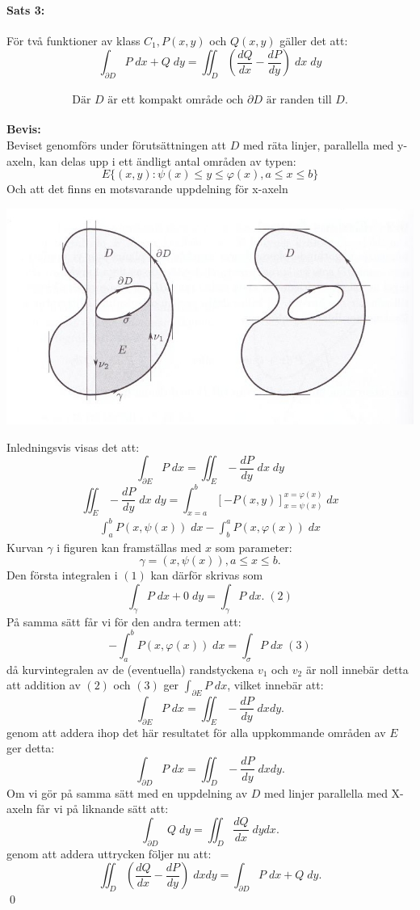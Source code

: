 \paragraph{Sats 3:} För två funktioner av klass $C_1, P(x, y)$ och $Q(x, y)$ gäller det att:
$$\int_{\partial D} P\; dx + Q \; dy = \iint_D \left ( \frac {d Q} {d x} - \frac {d P} {d y}
	\right ) \; dx \; dy$$\\
$$\text{Där $D$ är ett kompakt område och $\partial D$ är randen till $D$.}$$
\\
{\bf Bevis:} \\
Beviset genomförs under förutsättningen att $D$ med räta linjer, parallella med y-axeln, kan delas upp i ett 
ändligt antal områden av typen:
$$E \{ (x, y): \psi(x) \le y \le \varphi(x), a \le x \le b \}$$
Och att det finns en motsvarande uppdelning för x-axeln
\begin{center}
	\includegraphics[scale=0.5]{linus_0001.jpg}
\end{center}
Inledningsvis visas det att:
$$\int_{\partial E} P \; dx = \iint_E - \frac {dP} {dy} \; dx \; dy$$
$$\iint_E - \frac {dP} {dy} \; dx \; dy = \int^b_{x=a} \left [ -P (x, y) \right ]^{x = \varphi(x)}_{x= \psi(x)} \; dx$$
\begin{align}
	\int_a^bP(x, \psi(x)) \; dx - \int_b^aP(x, \varphi(x)) \; dx
\end{align}
Kurvan $\gamma$ i figuren kan framställas med $x$ som parameter:
$$\gamma = (x, \psi(x)), a\le x \le b.$$
Den första integralen i $(1)$ kan därför skrivas som 
$$\int_{\gamma} P \; dx + 0 \; dy = \int_{\gamma} P \; dx. \; (2)$$
På samma sätt får vi för den andra termen att:
$$- \int_a^b P(x, \varphi(x)) \; dx = \int_{\sigma} P \; dx \; (3)$$ %
då kurvintegralen av de (eventuella) randstyckena $v_1$ och $v_2$ är noll innebär detta att
addition av $(2)$ och $(3)$ ger $\int_{\partial E} P \; dx$, vilket
innebär att:
$$\int_{\partial E} P \; dx = \iint_E - \frac {dP} {dy} \; dx dy.$$
genom att addera ihop det här resultatet för alla uppkommande områden av $E$ ger detta:
$$\int_{\partial D} P \; dx = \iint_D - \frac {dP} {dy} \; dx dy.$$
Om vi gör på samma sätt med en uppdelning av $D$ med linjer parallella med X-axeln får vi på liknande sätt att:
$$\int_{\partial D} Q \; dy = \iint_D \frac {dQ} {dx} \; dy dx.$$ 
genom att addera uttrycken följer nu att:
$$\iint_D \left ( \frac {dQ} {dx} - \frac {dP} {dy} \right ) \; dx dy = \int_{\partial D} P \; dx + Q \; dy.$$
\hfill \qed
